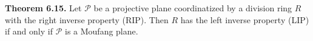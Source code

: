 \textbf{Theorem 6.15.} Let $\mathcal{P}$ be a projective plane coordinatized by a division ring $R$ with the right inverse property (RIP). Then $R$ has the left inverse property (LIP) if and only if $\mathcal{P}$ is a Moufang plane.

